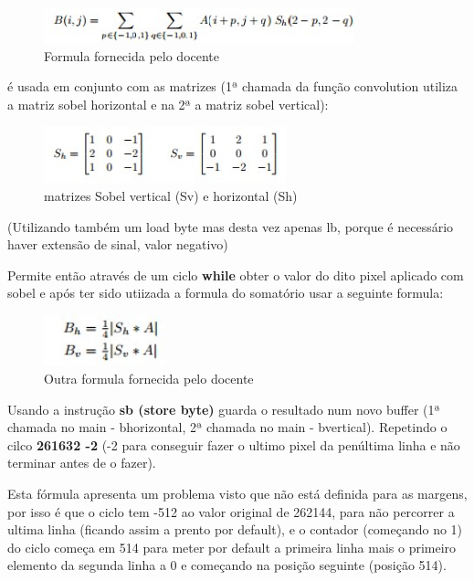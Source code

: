 \documentclass[a4paper,11pt]{article}
\begin{document}
\begin{figure}[ht!]
\centering
\includegraphics[width=90mm]{formula}
\caption{Formula fornecida pelo docente}
\label{overflow}
\end{figure}

é usada em conjunto com as matrizes (1ª chamada da função convolution utiliza a matriz sobel horizontal e na 2ª a matriz sobel vertical):

\begin{figure}[ht!]
\centering
\includegraphics[width=70mm]{matrizes}
\caption{matrizes Sobel vertical (Sv) e horizontal (Sh)}
\label{overflow}
\end{figure}

\begin{center}
(Utilizando também um load byte mas desta vez apenas lb, porque é necessário haver extensão de sinal, valor negativo)
\end{center}
Permite então através de um ciclo {\bf while} obter o valor do dito pixel aplicado com sobel e após ter sido utiizada a formula do somatório usar a seguinte formula:

\begin{figure}[ht!]
\centering
\includegraphics[width=35mm]{formula2}
\caption{Outra formula fornecida pelo docente}
\label{overflow}
\end{figure}

\newpage

Usando a instrução {\bf sb (store byte)} guarda o resultado num novo buffer (1ª chamada no main - bhorizontal, 2ª chamada no main - bvertical). Repetindo o cilco {\bf 261632 -2} (-2 para conseguir fazer o ultimo pixel da penúltima linha e não terminar antes de o fazer).
\newline

Esta fórmula apresenta um problema visto que não está definida para as margens, por isso é que o ciclo tem -512 ao valor original de 262144, para não percorrer a ultima linha (ficando assim a prento por default), e o contador (começando no 1) do ciclo começa em 514 para meter por default a primeira linha mais o primeiro elemento da segunda linha a 0 e começando na posição seguinte (posição 514).
\newline
\end{document}
